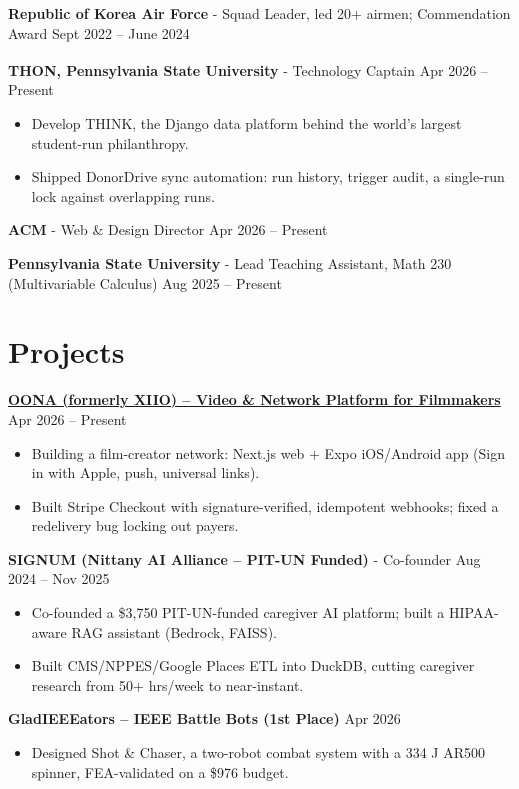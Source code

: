 \documentclass[11pt,a4paper]{article}
\newcommand{\blockspace}{\vspace{0.12em}}
\newenvironment{details}{\begin{itemize}[leftmargin=1.4em, label=\textbullet, topsep=0pt, itemsep=0pt, parsep=0pt, partopsep=0pt]}{\end{itemize}}
\begin{document}
\noindent\textbf{Republic of Korea Air Force} - Squad Leader, led 20+ airmen; Commendation Award \hfill Sept 2022 -- June 2024\par
\blockspace

\noindent\textbf{THON\textsuperscript{\texttrademark}, Pennsylvania State University} - Technology Captain \hfill Apr 2026 -- Present
\begin{details}
\item Develop THINK, the Django data platform behind the world's largest student-run philanthropy.
\item Shipped DonorDrive sync automation: run history, trigger audit, a single-run lock against overlapping runs.
\end{details}
\blockspace

\noindent\textbf{ACM} - Web \& Design Director \hfill Apr 2026 -- Present\par
\blockspace

\noindent\textbf{Pennsylvania State University} - Lead Teaching Assistant, Math 230 (Multivariable Calculus) \hfill Aug 2025 -- Present

\section{Projects}
\noindent\textbf{\href{https://xiio.vercel.app}{OONA (formerly XIIO) – Video \& Network Platform for Filmmakers}} \hfill Apr 2026 -- Present
\begin{details}
\item Building a film-creator network: Next.js web + Expo iOS/Android app (Sign in with Apple, push, universal links).
\item Built Stripe Checkout with signature-verified, idempotent webhooks; fixed a redelivery bug locking out payers.
\end{details}
\blockspace

\noindent\textbf{SIGNUM (Nittany AI Alliance – PIT-UN Funded)} - Co-founder \hfill Aug 2024 -- Nov 2025
\begin{details}
\item Co-founded a \$3,750 PIT-UN-funded caregiver AI platform; built a HIPAA-aware RAG assistant (Bedrock, FAISS).
\item Built CMS/NPPES/Google Places ETL into DuckDB, cutting caregiver research from 50+ hrs/week to near-instant.
\end{details}
\blockspace

\noindent\textbf{GladIEEEators – IEEE Battle Bots (1st Place)} \hfill Apr 2026
\begin{details}
\item Designed Shot \& Chaser, a two-robot combat system with a 334 J AR500 spinner, FEA-validated on a \$976 budget.
\end{details}
\end{document}
